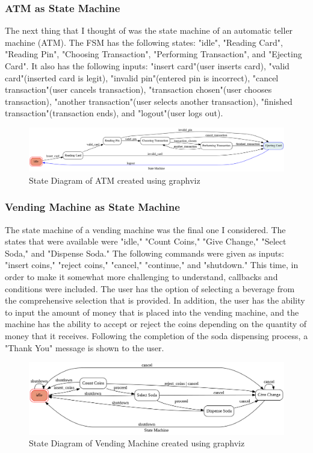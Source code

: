 \subsubsection{ATM as State Machine}
\normalsize{
The next thing that I thought of was the state machine of an automatic teller machine (ATM). The FSM has the following states: "idle", "Reading Card", "Reading Pin", "Choosing Transaction", "Performing Transaction", and "Ejecting Card". It also has the following inputs: "insert card"(user inserts card), "valid card"(inserted card is legit), "invalid pin"(entered pin is incorrect), "cancel transaction"(user cancels transaction), "transaction chosen"(user chooses transaction), "another transaction"(user selects another transaction), "finished transaction"(transaction ends), and "logout"(user logs out).
}

\begin{figure}[h!]
    \centering
    \includegraphics[width=1\textwidth,keepaspectratio]{images/FSM_ATM.png}
    \caption*{State Diagram of ATM created using graphviz}
\end{figure}

\subsubsection{Vending Machine as State Machine}
\normalsize{
The state machine of a vending machine was the final one I considered. The states that were available were "idle," "Count Coins," "Give Change," "Select Soda," and "Dispense Soda." The following commands were given as inputs: "insert coins," "reject coins," "cancel," "continue," and "shutdown." This time, in order to make it somewhat more challenging to understand, callbacks and conditions were included. The user has the option of selecting a beverage from the comprehensive selection that is provided. In addition, the user has the ability to input the amount of money that is placed into the vending machine, and the machine has the ability to accept or reject the coins depending on the quantity of money that it receives. Following the completion of the soda dispensing process, a "Thank You" message is shown to the user.
}
\begin{figure}[h!]
    \centering
    \includegraphics[width=\textwidth,keepaspectratio]{images/FSM_vending.png}
    \caption*{State Diagram of Vending Machine created using graphviz}
\end{figure}


